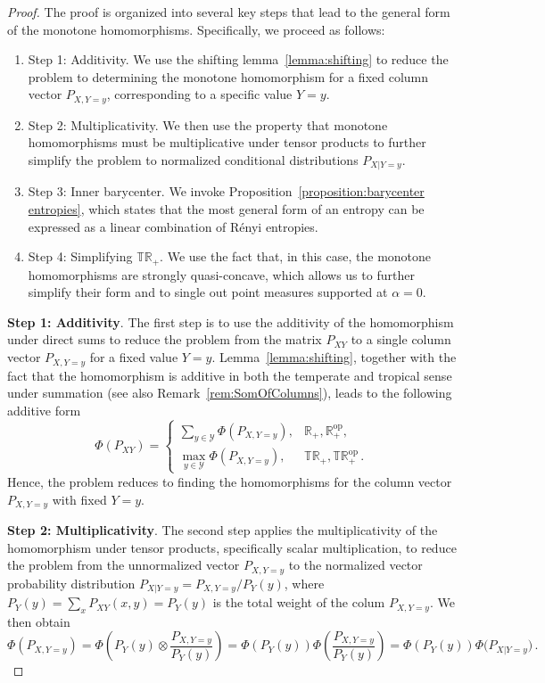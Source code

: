 \documentclass[aps,pra,11pt,onecolumn,nofootinbib,tightenlines]{revtex4-2}
\theoremstyle{definition}
\newcommand{\Y}{\mathcal{Y}}
\begin{document}
\begin{proof}
The proof is organized into several key steps that lead to the general form of the monotone homomorphisms. Specifically, we proceed as follows:
\begin{enumerate}
    \item Step 1: Additivity. We use the shifting lemma~\ref{lemma:shifting} to reduce the problem to determining the monotone homomorphism for a fixed column vector \( P_{X,Y=y} \), corresponding to a specific value \( Y = y \).
    \item Step 2: Multiplicativity. We then use the property that monotone homomorphisms must be multiplicative under tensor products to further simplify the problem to normalized conditional distributions \( P_{X|Y=y} \).
    \item Step 3: Inner barycenter. We invoke Proposition~\ref{proposition:barycenter entropies}, which states that the most general form of an entropy can be expressed as a linear combination of Rényi entropies. 
     \item Step 4: Simplifying $\mathbb{TR}_+$. We use the fact that, in this case, the monotone homomorphisms are strongly quasi-concave, which allows us to further simplify their form and to single out point measures supported at $\alpha=0$.
\end{enumerate}

\bigskip
\bigskip

 
\noindent\textbf{Step 1: Additivity}. The first step is to use the additivity of the homomorphism under direct sums to reduce the problem from the matrix $P_{XY}$ to a single column vector $P_{X,Y=y}$ for a fixed value $Y = y$.
Lemma~\ref{lemma:shifting}, together with the fact that the homomorphism is additive in both the temperate and tropical sense under summation (see also Remark~\ref{rem:SomOfColumns}), leads to the following additive form
\begin{equation}\label{eq:additivity}
\Phi(P_{XY}) =
\begin{cases}
\sum_{y \in \Y} \Phi(P_{X,Y=y}), & \mathbb{R}_+,\mathbb{R}_+^{\mathrm{op}}, \\
\max_{y \in \Y} \Phi(P_{X,Y=y}), & \mathbb{TR}_+,\mathbb{TR}_+^{\mathrm{op}} \,.
\end{cases}
\end{equation}
Hence, the problem reduces to finding the homomorphisms for the column vector $P_{X,Y=y}$ with fixed $Y=y$.

\bigskip
\bigskip
 \noindent\textbf{Step 2: Multiplicativity}. The second step applies the multiplicativity of the homomorphism under tensor products, specifically scalar multiplication, to reduce the problem from the unnormalized vector $P_{X,Y=y}$ to the normalized vector probability distribution $P_{X|Y=y} = P_{X,Y=y}/P_Y(y)$, where $P_Y(y) = \sum_x P_{XY}(x,y) = P_Y(y)$ is the total weight of the colum $P_{X,Y=y}$. We then obtain
 \begin{equation}\label{eq:normalize}
     \Phi(P_{X,Y=y}) = \Phi\left(P_Y(y) \otimes \frac{P_{X,Y=y}}{P_Y(y)}\right) =\Phi(P_Y(y)) \Phi\left(\frac{P_{X,Y=y}}{P_Y(y)}\right) = \Phi(P_Y(y)) \Phi\big(P_{X|Y=y}\big) \,.
 \end{equation}
 

\end{proof}
\end{document}
